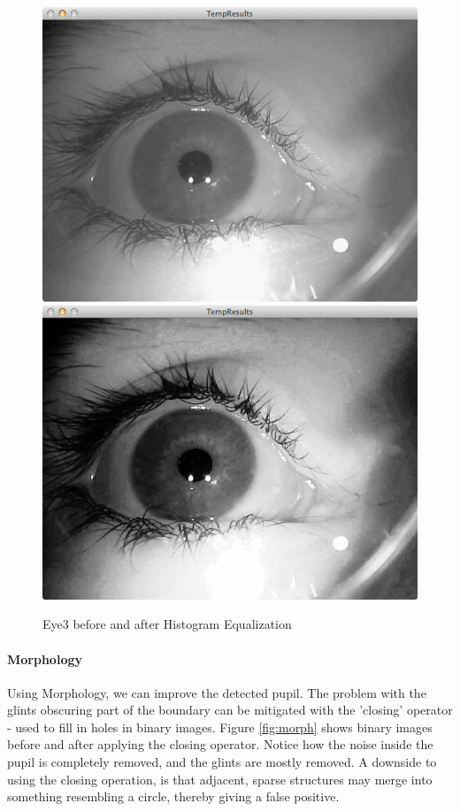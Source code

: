 \documentclass[a4paper,11pt]{article}
\begin{document}
\begin{figure}[H]
  \centering
  \includegraphics[scale=0.2]{eye3}
  \includegraphics[scale=0.2]{eye3_hist_eq}
  \caption{Eye3 before and after Histogram Equalization}
  \label{fig:eye3_hist_eq}
\end{figure}

\paragraph{Morphology}
Using Morphology, we can improve the detected pupil. The problem with the glints obscuring part of the boundary can be mitigated with the 'closing' operator - used to fill in holes in binary images. Figure \ref{fig:morph} shows binary images before and after applying the closing operator. Notice how the noise inside the pupil is completely removed, and the glints are mostly removed.
A downside to using the closing operation, is that adjacent, sparse structures may merge into something resembling a circle, thereby giving a false positive.
\end{document}
